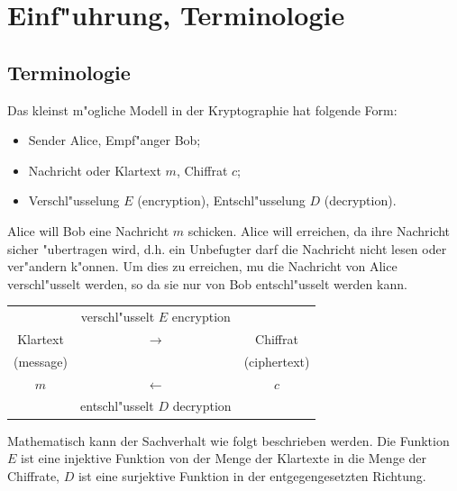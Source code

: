 \chapter*{Einf"uhrung, Terminologie}

\section*{Terminologie}

Das kleinst m"ogliche Modell in der Kryptographie hat folgende Form:

\begin{itemize}
 \item Sender Alice, Empf"anger Bob;
 \item Nachricht oder Klartext $m$, Chiffrat $c$;
 \item Verschl"usselung $E$ (encryption), Entschl"usselung $D$ (decryption).
\end{itemize}

Alice will Bob eine Nachricht $m$ schicken. Alice will erreichen,
da\3 ihre Nachricht sicher "ubertragen wird, d.h. ein Unbefugter
darf die Nachricht nicht lesen oder ver"andern k"onnen. 
Um dies zu erreichen, mu\3 die Nachricht von
Alice verschl"usselt werden, so da\3 sie nur von Bob
entschl"usselt werden kann.

\begin{center}
  \begin{tabular}{ccc}
              &   \shortstack{verschl"usselt\\ $E$ encryption}  &               \\
    Klartext  &   $\longrightarrow$                             & Chiffrat      \\
    (message) &                                                 & (ciphertext)  \\
    $m$       &   $\longleftarrow$                              & $c$           \\
              &   \shortstack{entschl"usselt\\ $D$ decryption}  & 
  \end{tabular}
\end{center}

Mathematisch kann der Sachverhalt wie folgt beschrieben
werden. Die Funktion $E$ ist eine injektive Funktion von der
Menge der Klartexte in die Menge der Chiffrate, $D$ ist eine
surjektive Funktion in der entgegengesetzten Richtung.

